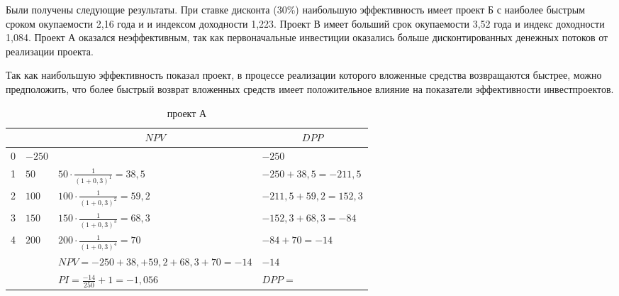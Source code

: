 Были получены следующие результаты. При ставке дисконта (30\%) наибольшую эффективность имеет проект Б с наиболее быстрым сроком окупаемости 2,16 года и и индексом доходности 1,223. Проект В имеет больший срок окупаемости 3,52 года и индекс доходности 1,084. Проект А оказался неэффективным, так как первоначальные инвестиции оказались больше дисконтированных денежных потоков от реализации проекта.

Так как наибольшую эффективность показал проект, в процессе реализации которого вложенные средства возвращаются быстрее, можно предположить, что более быстрый возврат вложенных средств имеет положительное влияние на показатели эффективности инвестпроектов.
%


\begin{table}[!h]
	\caption{проект А}
	\label{project_A}
	\small
	\setlength{\extrarowheight}{1.2mm}
		\begin{tabularx}{\textwidth}{|K{1.12cm}|K{1.12cm}|p{8cm}|p{5cm}|}
		\hline
		&&                       &  \\  &$ -250$&                                                                   &  $    -250   $                 \\  &$5$0& $50 \cdot \frac{1}{(1+0,3)^1} = 38,5$  &$ -250 +38,5   = -211,5     $            \\  & $100$&$100 \cdot \frac{1}{(1+0,3)^2} = 59,2$ & $-211,5  +59,2=152,3      $           \\  &$150 $&$150 \cdot \frac{1}{(1+0,3)^3} = 68,3$ &$-152,3  +68,3=-84    $             \\  &$200$& $200 \cdot \frac{1}{(1+0,3)^4} = 70$  & $-84 +70= -14     $                \\ \hline
		&&$NPV = -250+38,+59,2+68,3+70=-14$     & $-14 $                     \\ \hline
		&&$PI = \frac{-14}{250}+1=-1,056$                                        & $DPP = $                 \\ \hline
		\end{tabularx}
		\end{table}

